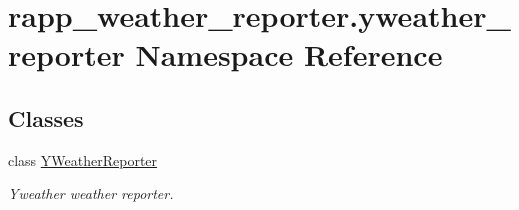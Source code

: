\hypertarget{namespacerapp__weather__reporter_1_1yweather__reporter}{\section{rapp\-\_\-weather\-\_\-reporter.\-yweather\-\_\-reporter Namespace Reference}
\label{namespacerapp__weather__reporter_1_1yweather__reporter}
}
\subsection*{Classes}
\begin{DoxyCompactItemize}
\item 
class \hyperlink{classrapp__weather__reporter_1_1yweather__reporter_1_1YWeatherReporter}{Y\-Weather\-Reporter}
\begin{DoxyCompactList}\small\item\em Yweather weather reporter. \end{DoxyCompactList}\end{DoxyCompactItemize}
